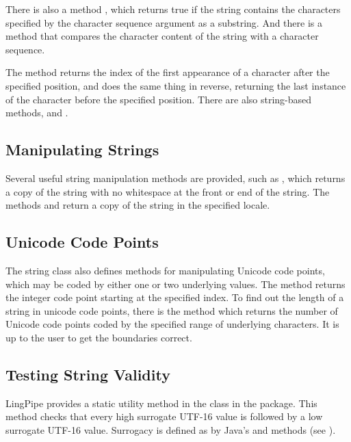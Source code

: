 There is also a method , which returns
true if the string contains the characters specified by the character
sequence argument as a substring.  And there is a method
 that compares the character content
of the string with a character sequence.

The  method returns the index of the first
appearance of a character after the specified position, and
 does the same thing in reverse,
returning the last instance of the character before the specified
position.  There are also string-based methods,  and
.

\subsection{Manipulating Strings}

Several useful string manipulation methods are provided, such as
, which returns a copy of the string with no whitespace
at the front or end of the string.  The methods
 and  return a
copy of the string in the specified locale.

\subsection{Unicode Code Points}

The string class also defines methods for manipulating Unicode
code points, which may be coded by either one or two underlying
 values.  The method  returns
the integer code point starting at the specified index.  To find out
the length of a string in unicode code points, there is the method
 which returns the number of Unicode
code points coded by the specified range of underlying characters.  It
is up to the user to get the boundaries correct.

\subsection{Testing String Validity}

LingPipe provides a static utility method
 in the  class in
the  package.  This method checks that every
high surrogate UTF-16  value is followed by a low surrogate
UTF-16 value.  Surrogacy is defined as by Java's
 and
 methods (see ).


